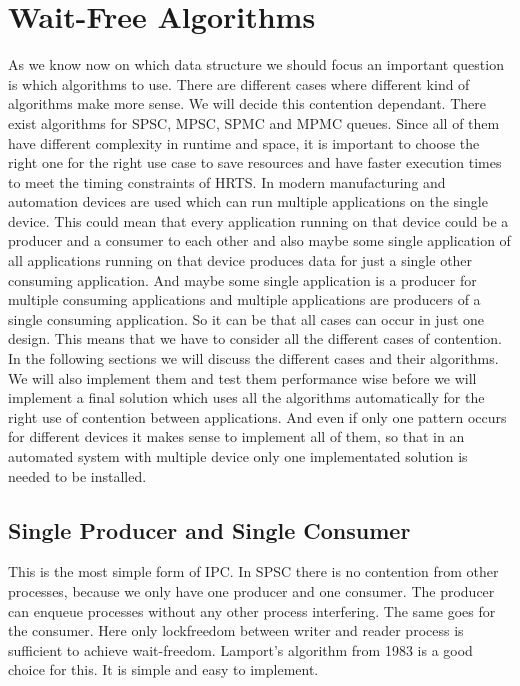 \section{Wait-Free Algorithms}\label{sec:wait-free-alg}
As we know now on which data structure we should focus an important question is which algorithms to use. There are different cases where different kind of algorithms make more sense. We will decide this contention dependant. There exist algorithms for \ac{SPSC}, \ac{MPSC}, \ac{SPMC} and \ac{MPMC} queues. Since all of them have different complexity in runtime and space, it is important to choose the right one for the right use case to save resources and have faster execution times to meet the timing constraints of \ac{HRTS}. In modern manufacturing and automation devices are used which can run multiple applications on the single device. This could mean that every application running on that device could be a producer and a consumer to each other and also maybe some single application of all applications running on that device produces data for just a single other consuming application. And maybe some single application is a producer for multiple consuming applications and multiple applications are producers of a single consuming application. So it can be that all cases can occur in just one design. This means that we have to consider all the different cases of contention. In the following sections we will discuss the different cases and their algorithms. We will also implement them and test them performance wise before we will implement a final solution which uses all the algorithms automatically for the right use of contention between applications. And even if only one pattern occurs for different devices it makes sense to implement all of them, so that in an automated system with multiple device only one implementated solution is needed to be installed.

\subsection{Single Producer and Single Consumer}\label{subsec:single-producer-and-single-consumer}
This is the most simple form of \ac{IPC}. In \ac{SPSC} there is no contention from other processes, because we only have one producer and one consumer. The producer can enqueue processes without any other process interfering. The same goes for the consumer. Here only lockfreedom between writer and reader process is sufficient to achieve wait-freedom. Lamport's algorithm from 1983 \cite{Lamport1983SPSCCircularBuffer} is a good choice for this. It is simple and easy to implement. 

